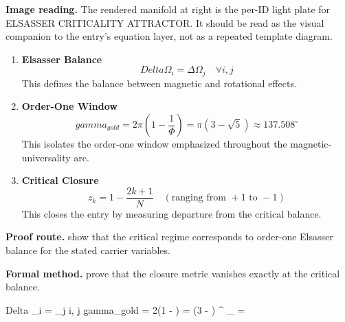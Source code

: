 \begin{samepage}
\noindent\begin{minipage}[t]{0.45\linewidth}
\vspace{0pt}
\raggedright
\scriptsize\textbf{Image reading.} The rendered manifold at right is the per-ID light plate for ELSASSER CRITICALITY ATTRACTOR. It should be read as the visual companion to the entry's equation layer, not as a repeated template diagram.\par
\end{minipage}\hfill
\begin{minipage}[t]{0.53\linewidth}
\vspace*{-0.10in}
\raggedright
{}
\end{minipage}
\end{samepage}

\clearpage


\begin{enumerate}[leftmargin=1.6em,itemsep=9pt,topsep=6pt]
\item \textbf{Elsasser Balance}
\[
Delta \Omega_i = \Delta \Omega_j \quad \forall i, j
\]
This defines the balance between magnetic and rotational effects.

\item \textbf{Order-One Window}
\[
gamma_{gold} = 2\pi (1 - \frac{1}{\Phi}) = \pi(3 - \sqrt{5}) \approx 137.508^\circ
\]
This isolates the order-one window emphasized throughout the magnetic-universality arc.

\item \textbf{Critical Closure}
\[
z_k = 1 - \frac{2k+1}{N} \quad (\text{ranging from } +1 \text{ to } -1)
\]
This closes the entry by measuring departure from the critical balance.
\end{enumerate}

\textbf{Proof route.} show that the critical regime corresponds to order-one Elsasser balance for the stated carrier variables.

\textbf{Formal method.} prove that the closure metric vanishes exactly at the critical balance.

\medskip
{}

\begin{tzpsnapshot}
\end{tzpsnapshot}

\tzpequationlinks
  {Delta \Omega_i = \Delta \Omega_j \quad \forall i, j}
  {gamma_{gold} = 2\pi (1 - ) = \pi(3 - ) ^\circ}
  {\Pi_{\Lambda} = \cdots}
